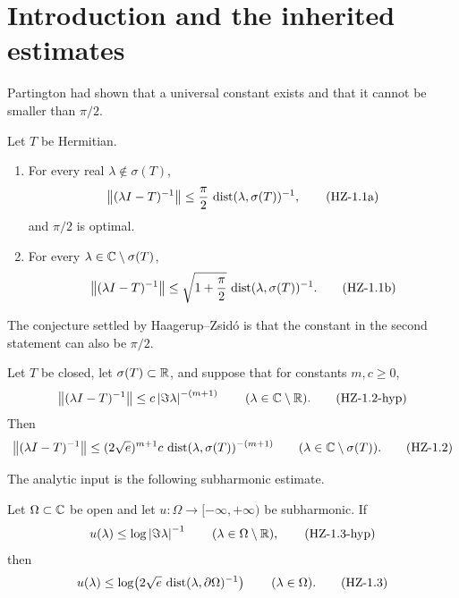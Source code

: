 \section{Introduction and the inherited estimates}


Partington had shown that a universal constant exists and that it cannot be smaller than $\pi/2$.

\begin{theorem}
Let $T$ be Hermitian.
\begin{enumerate}[label=(\arabic*)]
\item For every real $\lambda\notin\sigma(T)$,
\[
  \left\lVert (\lambda I-T)^{-1}\right\rVert
  \le \frac{\pi}{2}\,\operatorname{dist}(\lambda,\sigma(T))^{-1},
  \tag{HZ-1.1a}\label{HZ-1.1a}
\]
and $\pi/2$ is optimal.
\item For every $\lambda\in\mathbb{C}\setminus\sigma(T)$,
\[
  \left\lVert (\lambda I-T)^{-1}\right\rVert
  \le \sqrt{1+\frac{\pi}{2}}\,
      \operatorname{dist}(\lambda,\sigma(T))^{-1}.
  \tag{HZ-1.1b}\label{HZ-1.1b}
\]
\end{enumerate}
\end{theorem}

The conjecture settled by Haagerup--Zsid\'o is that the constant in the second statement can also be $\pi/2$.

\begin{theorem}
Let $T$ be closed, let $\sigma(T)\subset\mathbb{R}$, and suppose that for constants $m,c\ge0$,
\[
  \left\lVert (\lambda I-T)^{-1}\right\rVert
  \le c\left\lvert \Im\lambda\right\rvert^{-(m+1)}
  \qquad(\lambda\in\mathbb{C}\setminus\mathbb{R}).
  \tag{HZ-1.2-hyp}\label{HZ-1.2-hyp}
\]
Then
\[
  \left\lVert (\lambda I-T)^{-1}\right\rVert
  \le (2\sqrt e)^{m+1}c\,
      \operatorname{dist}(\lambda,\sigma(T))^{-(m+1)}
  \qquad(\lambda\in\mathbb{C}\setminus\sigma(T)).
  \tag{HZ-1.2}\label{HZ-1.2}
\]
\end{theorem}

The analytic input is the following subharmonic estimate.

\begin{lemma}
Let $\Omega\subset\mathbb{C}$ be open and let $u:\Omega\to[-\infty,+\infty)$ be subharmonic. If
\[
  u(\lambda)\le \log\left\lvert \Im\lambda\right\rvert^{-1}
  \qquad(\lambda\in\Omega\setminus\mathbb{R}),
  \tag{HZ-1.3-hyp}\label{HZ-1.3-hyp}
\]
then
\[
  u(\lambda)
  \le \log\!\left(2\sqrt e\,\operatorname{dist}(\lambda,\partial\Omega)^{-1}\right)
  \qquad(\lambda\in\Omega).
  \tag{HZ-1.3}\label{HZ-1.3}
\]
\end{lemma}

